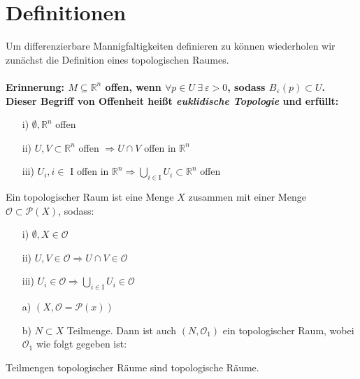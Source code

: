 \section{Definitionen}
Um differenzierbare Mannigfaltigkeiten definieren zu können wiederholen wir zunächst die Definition eines topologischen Raumes. \\
\phantom{.}\\
\bfseries Erinnerung: \normalfont $M \subseteq \mathbb{R}^n$ offen, wenn $\forall p \in U \ \exists \ \varepsilon>0$, sodass $B_{\varepsilon}(p) \subset U$. Dieser Begriff von Offenheit heißt \textit{euklidische Topologie} \normalfont und erfüllt:
\begin{enumerate}
\item[i)] $\emptyset, \mathbb{R}^n$ offen
\item[ii)] $U, V \subset \mathbb{R}^n$ offen $\Rightarrow U \cap V$ offen in $\mathbb{R}^n$
\item [iii)] $U_i, i \in $ I offen in $\mathbb{R}^n \Rightarrow \bigcup\limits_{i \in \text{I}} U_i \subset \mathbb{R}^n$ offen
\end{enumerate} 
\begin{defs}
Ein topologischer Raum ist eine Menge $X$ zusammen mit einer Menge $\mathcal{O} \subset \mathcal{P}(X)$, sodass:
\begin{enumerate}
	\item[i)] $\emptyset, X \in \mathcal{O}$
	\item[ii)] $U, V \in \mathcal{O} \Rightarrow  U \cap V \in \mathcal{O}$
	\item [iii)] $U_i \in \mathcal{O} \Rightarrow\bigcup\limits_{i \in \text{I}} U_i \in \mathcal{O}$
\end{enumerate} 
\end{defs}
\begin{bsp}
\begin{enumerate}
	\item[a)] $( X, \mathcal{O} = \mathcal{P}(x) )$
	\item[b)] $N \subset X$ Teilmenge. Dann ist auch $(N,\mathcal{O}_1)$ ein topologischer Raum, wobei $\mathcal{O}_1$ wie folgt gegeben ist:\\
\end{enumerate}
Teilmengen topologischer Räume sind topologische Räume.
\end{bsp}

